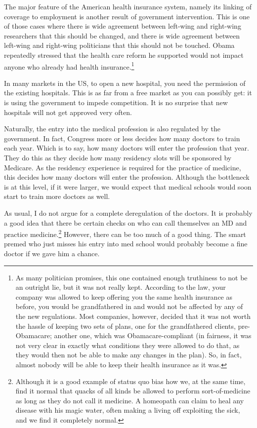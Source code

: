 The major feature of the American health insurance system, namely its linking
of coverage to employment is another result of government intervention. This is
one of those cases where there is wide agreement between left-wing and
right-wing researchers that this should be changed, and there is wide agreement
between left-wing and right-wing politicians that this should not be touched.
Obama repeatedly stressed that the health care reform he supported would not
impact anyone who already had health insurance.\footnote{As many politician
promises, this one contained enough truthiness to not be an outright lie, but
it was not really kept. According to the law, your company was allowed to keep
offering you the same health insurance as before, you would be grandfathered in
and would not be affected by any of the new regulations. Most companies,
however, decided that it was not worth the hassle of keeping two sets of plans,
one for the grandfathered clients, pre-Obamacare; another one,
which was Obamacare-compliant (in fairness, it was not very clear in exactly
what conditions they were allowed to do that, as they would then not be able to
make any changes in the plan). So, in fact, almost nobody will be able to keep
their health insurance as it was.}

In many markets in the US, to open a new hospital, you need the permission of
the existing hospitals. This is as far from a free market as you can possibly
get: it is using the government to impede competition. It is no surprise that
new hospitals will not get approved very often.

Naturally, the entry into the medical profession is also regulated by the
government. In fact, Congress more or less decides how many doctors to train
each year. Which is to say, how many doctors will enter the profession that
year. They do this as they decide how many residency slots will be sponsored by
Medicare. As the residency experience is required for the practice of medicine,
this decides how many doctors will enter the profession. Although the
bottleneck is at this level, if it were larger, we would expect that medical
schools would soon start to train more doctors as well.

As usual, I do not argue for a complete deregulation of the doctors. It is
probably a good idea that there be certain checks on who can call themselves an
MD and practice medicine.\footnote{Although it is a good example of status quo
bias how we, at the same time, find it normal that quacks of all kinds be
allowed to perform sort-of-medicine as long as they do not call it medicine. A
homeopath can claim to heal any disease with his magic water, often making a
living off exploiting the sick, and we find it completely normal.} However,
there can be too much of a good thing. The smart premed who just misses his
entry into med school would probably become a fine doctor if we gave him a
chance.

